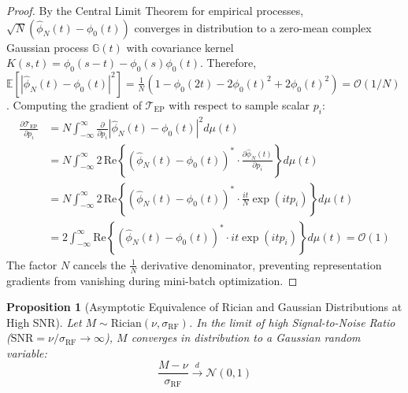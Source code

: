 \documentclass{article}
\newtheorem{proposition}{Proposition}
\begin{document}
\begin{proof}
By the Central Limit Theorem for empirical processes, $\sqrt{N}(\hat{\phi}_N(t) - \phi_0(t))$ converges in distribution to a zero-mean complex Gaussian process $\mathbb{G}(t)$ with covariance kernel $K(s, t) = \phi_0(s - t) - \phi_0(s)\phi_0(t)$. Therefore, $\mathbb{E}[|\hat{\phi}_N(t) - \phi_0(t)|^2] = \frac{1}{N} (1 - \phi_0(2t) - 2\phi_0(t)^2 + 2\phi_0(t)^2) = \mathcal{O}(1/N)$. 
Computing the gradient of $\mathcal{T}_{\text{EP}}$ with respect to sample scalar $p_i$:
\begin{align}
    \frac{\partial \mathcal{T}_{\text{EP}}}{\partial p_i} &= N \int_{-\infty}^\infty \frac{\partial}{\partial p_i} |\hat{\phi}_N(t) - \phi_0(t)|^2 d\mu(t) \\
    &= N \int_{-\infty}^\infty 2 \, \text{Re}\left\{ (\hat{\phi}_N(t) - \phi_0(t))^* \cdot \frac{\partial \hat{\phi}_N(t)}{\partial p_i} \right\} d\mu(t) \\
    &= N \int_{-\infty}^\infty 2 \, \text{Re}\left\{ (\hat{\phi}_N(t) - \phi_0(t))^* \cdot \frac{i t}{N} \exp(i t p_i) \right\} d\mu(t) \\
    &= 2 \int_{-\infty}^\infty \text{Re}\left\{ (\hat{\phi}_N(t) - \phi_0(t))^* \cdot i t \exp(i t p_i) \right\} d\mu(t) = \mathcal{O}(1)
\end{align}
The factor $N$ cancels the $\frac{1}{N}$ derivative denominator, preventing representation gradients from vanishing during mini-batch optimization.
\end{proof}

\begin{proposition}[Asymptotic Equivalence of Rician and Gaussian Distributions at High SNR]
\label{prop:rician_asymptotics}
Let $M \sim \text{Rician}(\nu, \sigma_{\text{RF}})$. In the limit of high Signal-to-Noise Ratio ($\text{SNR} = \nu / \sigma_{\text{RF}} \to \infty$), $M$ converges in distribution to a Gaussian random variable:
\begin{equation}
    \frac{M - \nu}{\sigma_{\text{RF}}} \xrightarrow{d} \mathcal{N}(0, 1)
\end{equation}
\end{proposition}
\end{document}
